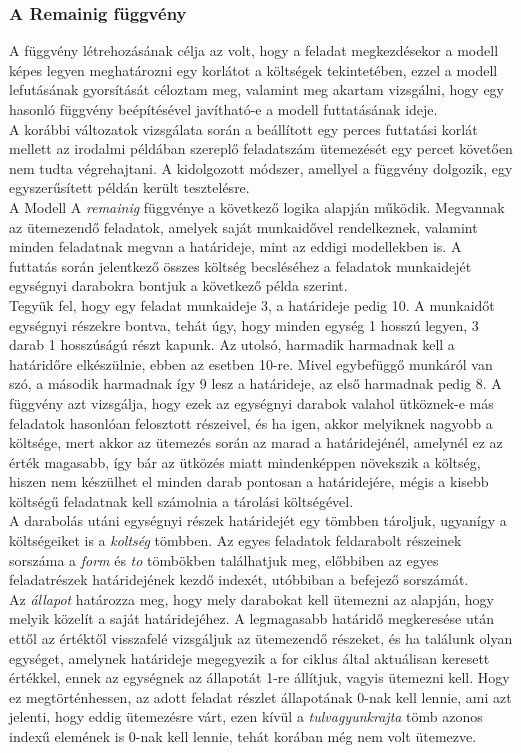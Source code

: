 \documentclass {report}
\begin{document}
\subsubsection{A Remainig függvény}
A függvény létrehozásának célja az volt, hogy a feladat megkezdésekor a modell képes legyen meghatározni egy korlátot a költségek tekintetében, ezzel a modell lefutásának gyorsítását céloztam meg, valamint meg akartam vizsgálni, hogy egy hasonló függvény beépítésével javítható-e a modell futtatásának ideje.\\
A korábbi változatok vizsgálata során a beállított egy perces futtatási korlát mellett az irodalmi példában szereplő feladatszám ütemezését egy percet követően nem tudta végrehajtani. A kidolgozott módszer, amellyel a függvény dolgozik, egy egyszerűsített példán került tesztelésre.\\
A Modell A \emph{remainig} függvénye a következő logika alapján működik. Megvannak az ütemezendő feladatok, amelyek saját munkaidővel rendelkeznek, valamint minden feladatnak megvan a határideje, mint az eddigi modellekben is. A futtatás során jelentkező összes költség becsléséhez a feladatok munkaidejét egységnyi darabokra bontjuk a következő példa szerint.\\
Tegyük fel, hogy egy feladat munkaideje 3, a határideje pedig 10. A munkaidőt egységnyi részekre bontva, tehát úgy, hogy minden egység 1 hosszú legyen, 3 darab 1 hosszúságú részt kapunk. Az utolsó, harmadik harmadnak kell a határidőre elkészülnie, ebben az esetben 10-re. Mivel egybefüggő munkáról van szó, a második harmadnak így 9 lesz a határideje, az első harmadnak pedig 8. A függvény azt vizsgálja, hogy ezek az egységnyi darabok valahol ütköznek-e más feladatok hasonlóan felosztott részeivel, és ha igen, akkor melyiknek nagyobb a költsége, mert akkor az ütemezés során az marad a határidejénél, amelynél ez az érték magasabb, így bár az ütközés miatt mindenképpen növekszik a költség, hiszen nem készülhet el minden darab pontosan a határidejére, mégis a kisebb költségű feladatnak kell számolnia a tárolási költségével. \\
A darabolás utáni egységnyi részek határidejét egy tömbben tároljuk, ugyanígy a költségeiket is a \emph{koltség} tömbben. Az egyes feladatok feldarabolt részeinek sorszáma a \emph{form} és \emph{to} tömbökben találhatjuk meg, előbbiben az egyes feladatrészek határidejének kezdő indexét, utóbbiban a befejező sorszámát. \\
Az \emph{állapot} határozza meg, hogy mely darabokat kell ütemezni az alapján, hogy melyik közelít a saját határidejéhez. A legmagasabb határidő megkeresése után ettől az értéktől visszafelé vizsgáljuk az ütemezendő részeket, és ha találunk olyan egységet, amelynek határideje megegyezik a for ciklus által aktuálisan keresett értékkel, ennek az egységnek az állapotát 1-re állítjuk, vagyis ütemezni kell. Hogy ez megtörténhessen, az adott feladat részlet állapotának 0-nak kell lennie, ami azt jelenti, hogy eddig ütemezésre várt, ezen kívül a \emph{tulvagyunkrajta} tömb azonos indexű elemének is 0-nak kell lennie, tehát korában még nem volt ütemezve. \\
\end{document}
